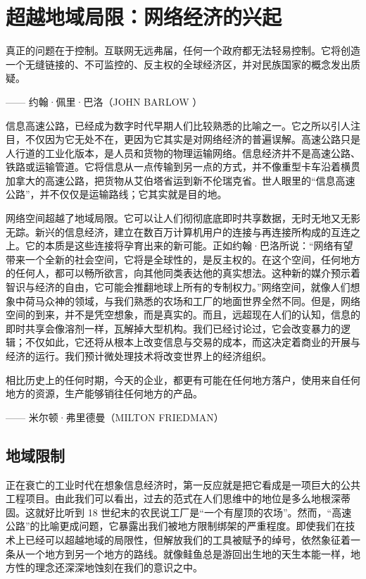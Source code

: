 \chapter[超越地域局限]{超越地域局限：网络经济的兴起} 

\begin{tcolorbox}
\kaishu 真正的问题在于控制。互联网无远弗届，任何一个政府都无法轻易控制。它将创造一个无缝链接的、不可监控的、反主权的全球经济区，并对民族国家的概念发出质疑。\begin{flushright}
—— 约翰·佩里·巴洛（JOHN BARLOW ）
\end{flushright}
\end{tcolorbox}

信息高速公路，已经成为数字时代早期人们比较熟悉的比喻之一。它之所以引人注目，不仅因为它无处不在，更因为它其实是对网络经济的普遍误解。高速公路只是人行道的工业化版本，是人员和货物的物理运输网络。信息经济并不是高速公路、铁路或运输管道。它将信息从一点传输到另一点的方式，并不像重型卡车沿着横贯加拿大的高速公路，把货物从艾伯塔省运到新不伦瑞克省。世人眼里的“信息高速公路”，并不仅仅是运输路线；它其实就是目的地。

网络空间超越了地域局限。它可以让人们彻彻底底即时共享数据，无时无地又无影无踪。新兴的信息经济，建立在数百万计算机用户的连接与再连接所构成的互连之上。它的本质是这些连接将孕育出来的新可能。正如约翰·巴洛所说：“网络有望带来一个全新的社会空间，它将是全球性的，是反主权的。在这个空间，任何地方的任何人，都可以畅所欲言，向其他同类表达他的真实想法。这种新的媒介预示着智识与经济的自由，它可能会推翻地球上所有的专制权力。”网络空间，就像人们想象中荷马众神的领域，与我们熟悉的农场和工厂的地面世界全然不同。但是，网络空间的到来，并不是凭空想象，而是真实的。而且，远超现在人们的认知，信息的即时共享会像溶剂一样，瓦解掉大型机构。我们已经讨论过，它会改变暴力的逻辑；不仅如此，它还将从根本上改变信息与交易的成本，而这决定着商业的开展与经济的运行。我们预计微处理技术将改变世界上的经济组织。

\begin{tcolorbox}
\kaishu 相比历史上的任何时期，今天的企业，都更有可能在任何地方落户，使用来自任何地方的资源，生产能够销往任何地方的产品。
\begin{flushright}
—— 米尔顿·弗里德曼（MILTON FRIEDMAN）
\end{flushright}
\end{tcolorbox}

\section{地域限制}
正在衰亡的工业时代在想象信息经济时，第一反应就是把它看成是一项巨大的公共工程项目。由此我们可以看出，过去的范式在人们思维中的地位是多么地根深蒂固。这就好比听到 18 世纪末的农民说工厂是“一个有屋顶的农场”。然而，“高速公路”的比喻更成问题，它暴露出我们被地方限制绑架的严重程度。即使我们在技术上已经可以超越地域的局限性，但解放我们的工具被赋予的绰号，依然象征着一条从一个地方到另一个地方的路线。就像鲑鱼总是游回出生地的天生本能一样，地方性的理念还深深地蚀刻在我们的意识之中。

